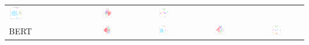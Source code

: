 \documentclass[a4paper]{article}
\begin{document}
\begin{table}[h!]
{\begin{tabular}{l|cc|cc}
			\includegraphics[width=0.2\textwidth]{"../assets/images/embeddings/BiLSTM_intent_embeddings_ATIS_single.png"} &
			\includegraphics[width=0.2\textwidth]{"../assets/images/embeddings/BiLSTM_slot_embeddings_SNIPS_single.png"} &
			\includegraphics[width=0.2\textwidth]{"../assets/images/embeddings/BiLSTM_intent_embeddings_SNIPS_single.png"} \\
			\cmidrule{1-5}
			BERT &  \includegraphics[width=0.2\textwidth]{"../assets/images/embeddings/BERT_slot_embeddings_ATIS_single.png"} &
			\includegraphics[width=0.2\textwidth]{"../assets/images/embeddings/BERT_intent_embeddings_ATIS_single.png"} &
			\includegraphics[width=0.2\textwidth]{"../assets/images/embeddings/BERT_slot_embeddings_SNIPS_single.png"} &
			\includegraphics[width=0.2\textwidth]{"../assets/images/embeddings/BERT_intent_embeddings_SNIPS_single.png"} \\
			\cmidrule{1-5}
		\end{tabular}
	}
	

\end{table}
\end{document}
